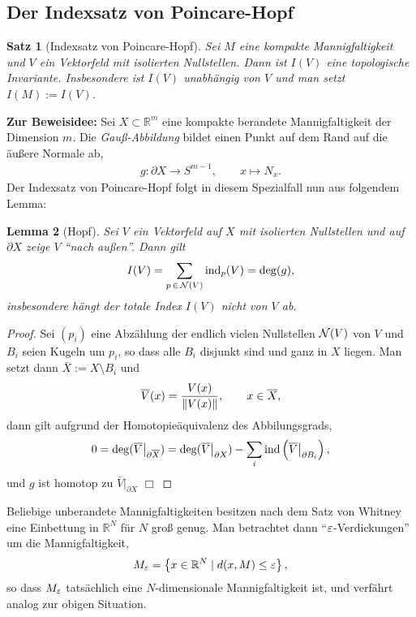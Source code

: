 \documentclass[12pt,a4paper]{article}
\def\R{\mathbb{R}}
\newtheorem{Lemma}{Lemma}[section]
\newtheorem{Satz}[Lemma]{Satz}
\def\qed{\quad\hfill\ensuremath{\Box}}
\begin{document}
\subsection{Der Indexsatz von Poincare-Hopf}

\begin{Satz}[Indexsatz von Poincare-Hopf]
Sei $M$ eine kompakte Mannigfaltigkeit und $V$ ein Vektorfeld mit isolierten
Nullstellen. Dann ist $I(V)$ eine topologische Invariante. Insbesondere ist
$I(V)$ unabh\"angig von $V$ und man setzt $I(M) := I(V)$.
\end{Satz}

{\bf Zur Beweisidee:}
Sei $X\subset\R^m$ eine kompakte berandete Mannigfaltigkeit der Dimension $m$.
Die \emph{Gau\ss{}-Abbildung} bildet einen Punkt auf dem Rand auf die \"au\ss{}ere Normale
ab,
\begin{align*}
g : \partial X\to S^{m-1},\qquad x\mapsto N_x.
\end{align*}
Der Indexsatz von Poincare-Hopf folgt in diesem Spezialfall nun aus folgendem
Lemma:

\begin{Lemma}[Hopf]
Sei $V$ ein Vektorfeld auf $X$ mit isolierten Nullstellen und auf $\partial X$
zeige $V$ "`nach au\ss{}en"'. Dann gilt
\begin{align*}
I(V) = \sum_{p\,\in\,\mathcal{N}(V)} \mathrm{ind}_p(V) = \deg(g),
\end{align*}
insbesondere h\"angt der totale Index $I(V)$ nicht von $V$ ab.
\end{Lemma}
\begin{proof}
Sei $(p_i)$ eine Abz\"ahlung der endlich vielen Nullstellen $\mathcal{N}(V)$ von $V$ und
$B_i$ seien Kugeln um $p_i$, so dass alle $B_i$ disjunkt sind und ganz in $X$
liegen. Man setzt dann $\bar{X} := X\setminus B_i$ und
\begin{align*}
\overline{V}(x) = \frac{V(x)}{\left\|V(x)\right\|},\qquad x\in \overline{X},
\end{align*}
dann gilt aufgrund der Homotopie\"aquivalenz des Abbilungsgrads,
\begin{align*}
0 = \deg(\overline{V}\big|_{\partial \overline{X}}) =
\deg(\overline{V}\big|_{\partial X}) - \sum_i \mathrm{ind}\left(\overline{V}\big|_{\partial B_i}
\right),
\end{align*}
und $g$ ist homotop zu $\bar{V}\big|_{\partial X}$
\qed
\end{proof}

\bigskip

Beliebige unberandete Mannigfaltigkeiten besitzen nach dem Satz von
Whitney eine Einbettung in $\R^N$ f\"ur $N$ gro\ss{} genug. Man betrachtet dann
"`$\varepsilon$-Verdickungen"' um die Mannigfaltigkeit,
\begin{align*}
M_\ep = \setdef{x\in\R^N}{d(x,M) \le \ep},
\end{align*}
so dass $M_\varepsilon$ tats\"achlich eine $N$-dimensionale Mannigfaltigkeit ist,
und verf\"ahrt analog zur obigen Situation.
\end{document}
